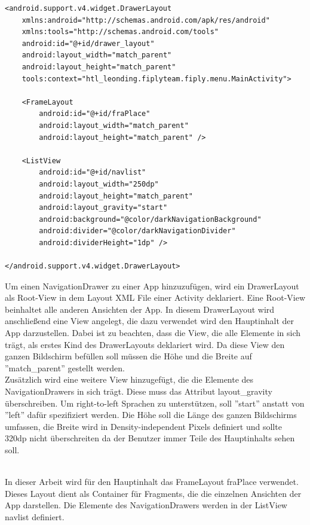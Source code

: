 \documentclass[FIPLY_base.tex]{subfiles}
\begin{document}
\newpage
\begin{lstlisting}[caption={Layout XML File eines NavigationDrawers},label=DescriptiveLabel]
<android.support.v4.widget.DrawerLayout
	xmlns:android="http://schemas.android.com/apk/res/android"
	xmlns:tools="http://schemas.android.com/tools"
	android:id="@+id/drawer_layout"
	android:layout_width="match_parent"
	android:layout_height="match_parent"
	tools:context="htl_leonding.fiplyteam.fiply.menu.MainActivity">

	<FrameLayout
		android:id="@+id/fraPlace"
		android:layout_width="match_parent"
		android:layout_height="match_parent" />

	<ListView
		android:id="@+id/navlist"
		android:layout_width="250dp"
		android:layout_height="match_parent"
		android:layout_gravity="start"
		android:background="@color/darkNavigationBackground"
		android:divider="@color/darkNavigationDivider"
		android:dividerHeight="1dp" />

</android.support.v4.widget.DrawerLayout>
\end{lstlisting}
Um einen NavigationDrawer zu einer App hinzuzufügen, wird ein DrawerLayout als Root-View in dem Layout XML File einer Activity deklariert. 
Eine Root-View beinhaltet alle anderen Ansichten der App. 
In diesem DrawerLayout wird anschließend eine View angelegt, die dazu verwendet wird den Hauptinhalt der App darzustellen.
Dabei ist zu beachten, dass die View, die alle Elemente in sich trägt, als erstes Kind des DrawerLayouts deklariert wird.
Da diese View den ganzen Bildschirm befüllen soll müssen die Höhe und die Breite auf ''match\_parent'' gestellt werden.
\ \\
Zusätzlich wird eine weitere View hinzugefügt, die die Elemente des NavigationDrawers in sich trägt. 
Diese muss das Attribut layout\_gravity überschreiben. 
Um right-to-left Sprachen zu unterstützen, soll ''start'' anstatt von ''left'' dafür spezifiziert werden. 
Die Höhe soll die Länge des ganzen Bildschirms umfassen, die Breite wird in Density-independent Pixels definiert und sollte 320dp nicht überschreiten da der Benutzer immer Teile des Hauptinhalts sehen soll. 

\ \\
In dieser Arbeit wird für den Hauptinhalt das FrameLayout fraPlace verwendet. 
Dieses Layout dient als Container für Fragments, die die einzelnen Ansichten der App darstellen.
Die Elemente des NavigationDrawers werden in der ListView navlist definiert.
\end{document}
